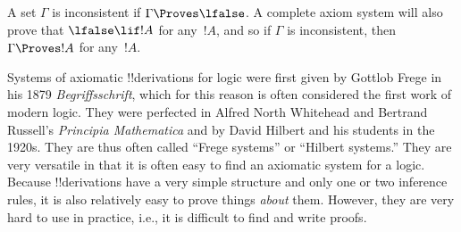 A set $\Gamma$ is inconsistent if $\Gamma \Proves \lfalse$. A complete
axiom system will also prove that $\lfalse \lif !A$ for any~$!A$, and
so if $\Gamma$ is inconsistent, then $\Gamma \Proves !A$ for any~$!A$.

Systems of axiomatic !!{derivation}s for logic were first given by
Gottlob Frege in his 1879 \emph{Begriffsschrift}, which for this
reason is often considered the first work of modern logic. They were
perfected in Alfred North Whitehead and Bertrand Russell's
\emph{Principia Mathematica} and by David Hilbert and his students in
the 1920s. They are thus often called ``Frege systems'' or ``Hilbert
systems.'' They are very versatile in that it is often easy to find
an axiomatic system for a logic. Because !!{derivation}s have a very
simple structure and only one or two inference rules, it is also
relatively easy to prove things \emph{about} them. However, they are
very hard to use in practice, i.e., it is difficult to find and write
proofs.



\OLEndChapterHook




  


